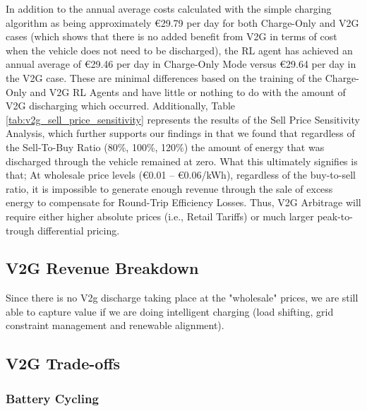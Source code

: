 In addition to the annual average costs calculated with the simple charging algorithm as being approximately €29.79 per day for both Charge-Only and V2G cases (which shows that there is no added benefit from V2G in terms of cost when the vehicle does not need to be discharged), the RL agent has achieved an annual average of €29.46 per day in Charge-Only Mode versus €29.64 per day in the V2G case. These are minimal differences based on the training of the Charge-Only and V2G RL Agents and have little or nothing to do with the amount of V2G discharging which occurred.
Additionally, Table \ref{tab:v2g_sell_price_sensitivity} represents the results of the Sell Price Sensitivity Analysis, which further supports our findings in that we found that regardless of the Sell-To-Buy Ratio (80\%, 100\%, 120\%) the amount of energy that was discharged through the vehicle remained at zero. What this ultimately signifies is that; At wholesale price levels (€0.01 -- €0.06/kWh), regardless of the buy-to-sell ratio, it is impossible to generate enough revenue through the sale of excess energy to compensate for Round-Trip Efficiency Losses. Thus, V2G Arbitrage will require either higher absolute prices (i.e., Retail Tariffs) or much larger peak-to-trough differential pricing.
\subsection{V2G Revenue Breakdown}
\label{subsec:v2g_revenue}

Since there is no V2g discharge taking place at the "wholesale" prices, we are still able to capture value if we are doing intelligent charging (load shifting, grid constraint management and renewable alignment).

\subsection{V2G Trade-offs}
\label{subsec:v2g_tradeoffs}

\subsubsection{Battery Cycling}

\begin{table}[H]
\centering
\caption{Battery cycling comparison}
\label{tab:battery_cycling}
\end{table}


